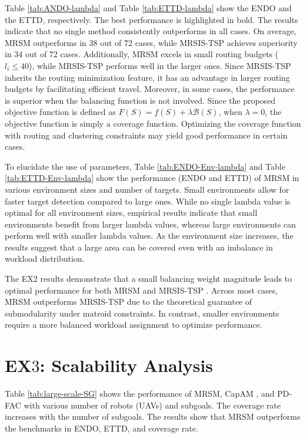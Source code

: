Table \ref{tab:ANDO-lambda} and Table \ref{tab:ETTD-lambda} show the ENDO and the ETTD, respectively.
The best performance is highlighted in bold.
The results indicate that no single method consistently outperforms in all cases.
On average, MRSM outperforms in 38 out of 72 cases, while MRSIS-TSP\cite{li2024mrsis} achieves superiority in 34 out of 72 cases.
Additionally, MRSM excels in small routing budgets ($l_i\leq40$), while MRSIS-TSP\cite{li2024mrsis} performs well in the larger ones.
Since MRSIS-TSP\cite{li2024mrsis} inherits the routing minimization feature, it has an advantage in larger routing budgets by facilitating efficient travel.
Moreover, in some cases, the performance is superior when the balancing function is not involved.
Since the proposed objective function is defined as $F(S)=f(S)+\lambda \mathcal{B}(S)$, when $\lambda=0$, the objective function is simply a coverage function.
Optimizing the coverage function with routing and clustering constraints may yield good performance in certain cases.

To elucidate the use of parameters, Table \ref{tab:ENDO-Env-lambda} and Table \ref{tab:ETTD-Env-lambda} show the performance (ENDO and ETTD) of MRSM in various environment sizes and number of targets. Small environments allow for faster target detection compared to large ones. While no single lambda value is optimal for all environment sizes, empirical results indicate that small environments benefit from larger lambda values, whereas large environments can perform well with smaller lambda values. As the environment size increases, the results suggest that a large area can be covered even with an imbalance in workload distribution.


The EX2 results demonstrate that a small balancing weight magnitude leads to optimal performance for both MRSM and MRSIS-TSP \cite{li2024mrsis}. Across most cases, MRSM outperforms MRSIS-TSP \cite{li2024mrsis} due to the theoretical guarantee of submodularity under matroid constraints. In contrast, smaller environments require a more balanced workload assignment to optimize performance.



\section{EX$3$: Scalability Analysis}
Table \ref{tab:large-scale-SG} shows the performance of MRSM, CapAM \cite{paull2022learning}, and PD-FAC \cite{sheng2022pd} with various number of robots (UAVs) and subgoals. The coverage rate increases with the number of subgoals. The results show that MRSM outperforms the benchmarks in ENDO, ETTD, and coverage rate.

